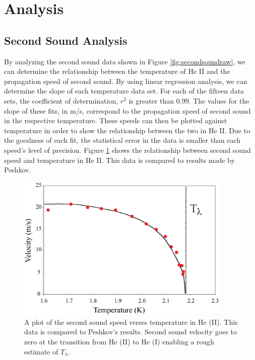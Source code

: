 
\section{Analysis}\label{analysis}
\subsection{Second Sound Analysis}\label{secondsoundanalysis}

By analyzing the second sound data shown in Figure \ref{fig:secondsoundraw}, we can determine the relationship between the temperature of He II and the propagation speed of second sound.  By using linear regression analysis, we can determine the slope of each temperature data set.  For each of the fifteen data sets, the coefficient of determination, $r^{2}$ is greater than $0.99$.  The values for the slope of these fits, in m/s, correspond to the propagation speed of second sound in the respective temperature.  These speeds can then be plotted against temperature in order to show the relationship between the two in He II.  Due to the goodness of each fit, the statistical error in the data is smaller than each speed's level of precision. Figure \ref{fig:secondsound} shows the relationship between second sound speed and temperature in He II.  This data is compared to results made by Peshkov.\cite{peshkov}

\begin{figure}[htbp]
\begin{center}
\includegraphics[height=70mm]{./figures/secondsound.eps}
\caption{\small{A plot of the second sound speed verses temperature in He (II).  This data is compared to Peshkov's results.\cite{peshkov} Second sound velocity goes to zero at the transition from He (II) to He (I) enabling a rough estimate of $T_{\lambda}$.}}
\label{fig:secondsound}
\end{center}
\end{figure}

